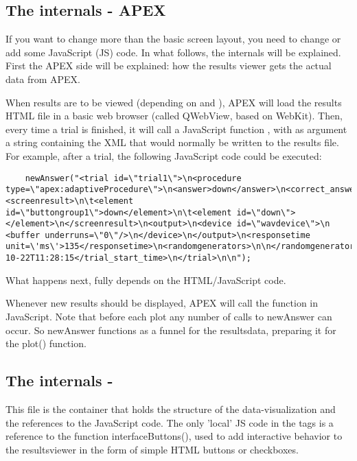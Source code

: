 \subsection{The internals - APEX}

If you want to change more than the basic screen layout, you need to change or add some JavaScript (JS) code. In what follows, the internals will be explained. First the APEX side will be explained: how the results viewer gets the actual data from APEX.

When results are to be viewed (depending on  and ), APEX will load the results HTML file in a basic web browser (called QWebView, based on WebKit). Then, every time a trial is finished, it will call a JavaScript function , with as argument a string containing the XML that would normally be written to the results file. For example, after a trial, the following JavaScript code could be executed:

\begin{lstlisting}
	newAnswer("<trial id=\"trial1\">\n<procedure type=\"apex:adaptiveProcedure\">\n<answer>down</answer>\n<correct_answer>up</correct_answer>\n<stimulus>stimulus1</stimulus>\n<correct>false</correct>\n\t<parameter>0</parameter>\n\t<stepsize>2</stepsize>\n\t<reversals>2</reversals>\n\t<saturation>false</saturation>\n\t<presentations>4</presentations>\n</procedure><screenresult>\n\t<element id=\"buttongroup1\">down</element>\n\t<element id=\"down\"></element>\n</screenresult>\n<output>\n<device id=\"wavdevice\">\n  <buffer underruns=\"0\"/>\n</device>\n</output>\n<responsetime unit=\'ms\'>135</responsetime>\n<randomgenerators>\n\n</randomgenerators>\n<trial_start_time>2015-10-22T11:28:15</trial_start_time>\n</trial>\n\n");
\end{lstlisting}

What happens next, fully depends on the HTML/JavaScript code.

Whenever new results should be displayed, APEX will call the  function in JavaScript. Note that before each plot any number of calls to newAnswer can occur. So newAnswer functions as a funnel for the resultsdata, preparing it for the plot() function.

\subsection{The internals - }

This file is the container that holds the structure of the data-visualization and the references to the JavaScript code. The only 'local' JS code in the  tags is a reference to the function interfaceButtons(), used to add interactive behavior to the resultsviewer in the form of simple HTML buttons or checkboxes.

